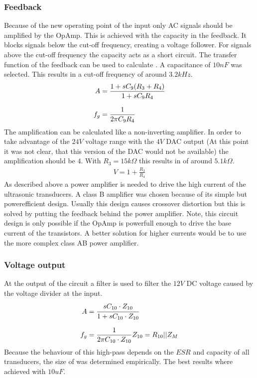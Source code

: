 \subsubsection*{Feedback}
%
Because of the new operating point of the input only AC signals should be amplified by the OpAmp. This is achieved with the capacity  in the feedback. It blocks signals below the cut-off frequency, creating a voltage follower. For signals above the cut-off frequency the capacity  acts as a short circuit. The transfer function of the feedback can be used to calculate . A capacitance of $10nF$ was selected. This results in a cut-off frequency of around $3.2kHz$.
%
\begin{align}
  A &= \frac{1 + s C_9 (R_3 + R_4)}{1 + s C_9 R_4}\pmath
  f_g &= \frac{1}{2 \pi C_9 R_4}
\end{align}
%
The amplification can be calculated like a non-inverting amplifier. In order to take advantage of the $24V$ voltage range with the $4V$ DAC output (At this point it was not clear, that this version of the DAC would not be available) the amplification should be $4$. With $R_3 = 15k\Omega$ this results in  of around $5.1k\Omega$.
%
\begin{align}
  V = 1 + \frac{R_3}{R_4}
\end{align}
%
As described above a power amplifier is needed to drive the high current of the ultrasonic transducers. A class B amplifier was chosen because of its simple but powerefficient design.\cite{okorn_halbleiterschaltung_2020} Usually this design causes crossover distortion but this is solved by putting the feedback behind the power amplifier. Note, this circuit design is only possible if the OpAmp is powerfull enough to drive the base current of the transistors. A better solution for higher currents would be to use the more complex class AB power amplifier.
\subsubsection*{Voltage output}
At the output of the circuit a   filter is used to filter the $12V$ DC voltage caused by the voltage divider at the input.
%
\begin{align}
  A &= \cfrac{sC_{10} \cdot Z_{10}}{1 + sC_{10} \cdot Z_{10}} \pmath
  f_g &= \frac{1}{2 \pi C_{10} \cdot Z_{10}}
  Z_{10} = R_{10} || Z_M
\end{align}
%
Because the behaviour of this high-pass depends on the $ESR$ and capacity of all transducers, the size of  was determined empirically. The best results where achieved with $10uF$.\p

